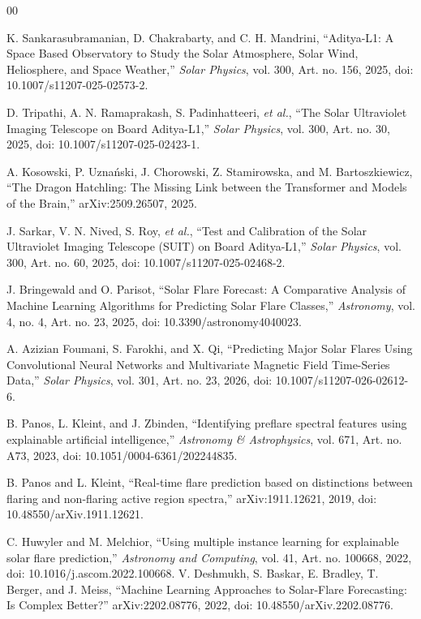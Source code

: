 \documentclass[oneside]{ieeeaccess}
\begin{document}
\begin{thebibliography}{00}

K. Sankarasubramanian, D. Chakrabarty, and C. H. Mandrini,
``Aditya-L1: A Space Based Observatory to Study the Solar Atmosphere, Solar Wind, Heliosphere, and Space Weather,''
\textit{Solar Physics}, vol. 300, Art. no. 156, 2025,
doi: 10.1007/s11207-025-02573-2.

D. Tripathi, A. N. Ramaprakash, S. Padinhatteeri, \textit{et al.},
``The Solar Ultraviolet Imaging Telescope on Board Aditya-L1,''
\textit{Solar Physics}, vol. 300, Art. no. 30, 2025,
doi: 10.1007/s11207-025-02423-1.

A. Kosowski, P. Uznański, J. Chorowski, Z. Stamirowska, and M. Bartoszkiewicz,
``The Dragon Hatchling: The Missing Link between the Transformer and Models of the Brain,''
arXiv:2509.26507, 2025.

J. Sarkar, V. N. Nived, S. Roy, \textit{et al.},
``Test and Calibration of the Solar Ultraviolet Imaging Telescope (SUIT) on Board Aditya-L1,''
\textit{Solar Physics}, vol. 300, Art. no. 60, 2025,
doi: 10.1007/s11207-025-02468-2.

J. Bringewald and O. Parisot,
``Solar Flare Forecast: A Comparative Analysis of Machine Learning Algorithms for Predicting Solar Flare Classes,''
\textit{Astronomy}, vol. 4, no. 4, Art. no. 23, 2025,
doi: 10.3390/astronomy4040023.

A. Azizian Foumani, S. Farokhi, and X. Qi,
``Predicting Major Solar Flares Using Convolutional Neural Networks and Multivariate Magnetic Field Time-Series Data,''
\textit{Solar Physics}, vol. 301, Art. no. 23, 2026,
doi: 10.1007/s11207-026-02612-6.

B. Panos, L. Kleint, and J. Zbinden,
``Identifying preflare spectral features using explainable artificial intelligence,''
\textit{Astronomy \& Astrophysics}, vol. 671, Art. no. A73, 2023,
doi: 10.1051/0004-6361/202244835.

B. Panos and L. Kleint,
``Real-time flare prediction based on distinctions between flaring and non-flaring active region spectra,''
arXiv:1911.12621, 2019,
doi: 10.48550/arXiv.1911.12621.

C. Huwyler and M. Melchior,
``Using multiple instance learning for explainable solar flare prediction,''
\textit{Astronomy and Computing}, vol. 41, Art. no. 100668, 2022,
doi: 10.1016/j.ascom.2022.100668.
V. Deshmukh, S. Baskar, E. Bradley, T. Berger, and J. Meiss,
``Machine Learning Approaches to Solar-Flare Forecasting: Is Complex Better?''
arXiv:2202.08776, 2022,
doi: 10.48550/arXiv.2202.08776.


\end{thebibliography}
\end{document}
